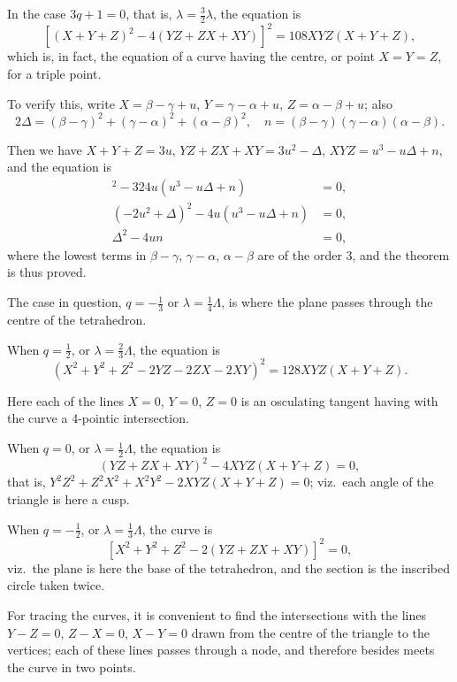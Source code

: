 \documentclass[11pt,a4paper]{book}
\begin{document}
\newpage
\setcounter{page}{3}

In the case $3q + 1 = 0$, that is, $\lambda = \tfrac{3}{2}\lambda$, the equation is
\[
[(X + Y + Z)^2 - 4(YZ + ZX + XY)]^2 = 108XYZ(X + Y + Z),
\]
which is, in fact, the equation of a curve having the centre, or point $X = Y = Z$, for a triple point.

To verify this, write $X = \beta - \gamma + u$, $Y = \gamma - \alpha + u$, $Z = \alpha - \beta + u$; also
\[
2\Delta = (\beta - \gamma)^2 + (\gamma - \alpha)^2 + (\alpha - \beta)^2,\quad n = (\beta - \gamma)(\gamma - \alpha)(\alpha - \beta).
\]

Then we have $X + Y + Z = 3u$, $YZ + ZX + XY = 3u^2 - \Delta$, $XYZ = u^3 - u\Delta + n$, and the equation is
\begin{align*}
[9u^2 - 9(3u^2 - \Delta)]^2 - 324u(u^3 - u\Delta + n) &= 0,\\
(-2u^2 + \Delta)^2 - 4u(u^3 - u\Delta + n) &= 0,\\
\Delta^2 - 4un &= 0,
\end{align*}
where the lowest terms in $\beta - \gamma$, $\gamma - \alpha$, $\alpha - \beta$ are of the order 3, and the theorem is thus proved.

The case in question, $q = -\tfrac{1}{3}$ or $\lambda = \tfrac{1}{4}\Lambda$, is where the plane passes through the centre of the tetrahedron.

When $q = \tfrac{1}{2}$, or $\lambda = \tfrac{2}{3}\Lambda$, the equation is
\[
(X^2 + Y^2 + Z^2 - 2YZ - 2ZX - 2XY)^2 = 128XYZ(X + Y + Z).
\]

Here each of the lines $X = 0$, $Y = 0$, $Z = 0$ is an osculating tangent having with the curve a 4-pointic intersection.

When $q = 0$, or $\lambda = \tfrac{1}{2}\Lambda$, the equation is
\[
(YZ + ZX + XY)^2 - 4XYZ(X + Y + Z) = 0,
\]
that is, $Y^2Z^2 + Z^2X^2 + X^2Y^2 - 2XYZ(X + Y + Z) = 0$; viz.\ each angle of the triangle is here a cusp.

When $q = -\tfrac{1}{2}$, or $\lambda = \tfrac{1}{3}\Lambda$, the curve is
\[
[X^2 + Y^2 + Z^2 - 2(YZ + ZX + XY)]^2 = 0,
\]
viz.\ the plane is here the base of the tetrahedron, and the section is the inscribed circle taken twice.

For tracing the curves, it is convenient to find the intersections with the lines $Y - Z = 0$, $Z - X = 0$, $X - Y = 0$ drawn from the centre of the triangle to the vertices; each of these lines passes through a node, and therefore besides meets the curve in two points.
\end{document}

